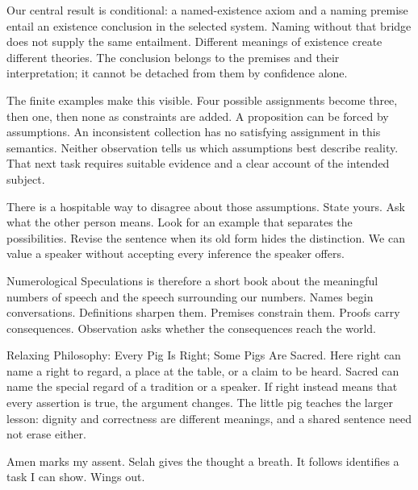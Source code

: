\documentclass[10pt]{article}
\begin{document}
Our central result is conditional: a named-existence axiom and a naming premise entail an existence conclusion in the selected system. Naming without that bridge does not supply the same entailment. Different meanings of existence create different theories. The conclusion belongs to the premises and their interpretation; it cannot be detached from them by confidence alone.\par
The finite examples make this visible. Four possible assignments become three, then one, then none as constraints are added. A proposition can be forced by assumptions. An inconsistent collection has no satisfying assignment in this semantics. Neither observation tells us which assumptions best describe reality. That next task requires suitable evidence and a clear account of the intended subject.\par
There is a hospitable way to disagree about those assumptions. State yours. Ask what the other person means. Look for an example that separates the possibilities. Revise the sentence when its old form hides the distinction. We can value a speaker without accepting every inference the speaker offers.\par
Numerological Speculations is therefore a short book about the meaningful numbers of speech and the speech surrounding our numbers. Names begin conversations. Definitions sharpen them. Premises constrain them. Proofs carry consequences. Observation asks whether the consequences reach the world.\par
Relaxing Philosophy: Every Pig Is Right; Some Pigs Are Sacred. Here right can name a right to regard, a place at the table, or a claim to be heard. Sacred can name the special regard of a tradition or a speaker. If right instead means that every assertion is true, the argument changes. The little pig teaches the larger lesson: dignity and correctness are different meanings, and a shared sentence need not erase either.\par
Amen marks my assent. Selah gives the thought a breath. It follows identifies a task I can show. Wings out.\par
\end{document}
